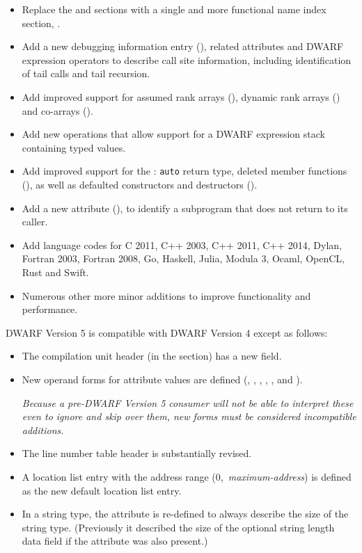\begin{itemize}
\item Replace the \dotdebugpubnames{} and \dotdebugpubtypes{} sections
with a single and more functional name index section, \dotdebugnames{}.
\item Add a new debugging information entry (\DWTAGcallsiteNAME), related 
attributes and DWARF expression operators to describe call site information, 
including identification of tail calls and tail recursion.
\item Add improved support for  assumed rank arrays 
(\DWTAGgenericsubrangeNAME), dynamic rank arrays (\DWATrankNAME)
and co-arrays (\DWTAGcoarraytypeNAME{}).
\item Add new operations that allow support for 
a DWARF expression stack containing typed values.
\item Add improved support for the :
\texttt{auto} return type, deleted member functions (\DWATdeletedNAME), 
as well as defaulted constructors and destructors (\DWATdefaultedNAME).
\item Add a new attribute (\DWATnoreturnNAME{}), to identify 
a subprogram that does not return to its caller.
\item Add language codes for C 2011, C++ 2003, C++ 2011, C++ 2014,
Dylan, Fortran 2003, Fortran 2008, Go, Haskell, 
Julia, Modula 3, Ocaml, OpenCL, Rust and Swift.
\item Numerous other more minor additions to improve functionality
and performance.
\end{itemize}

DWARF Version 5 is compatible with DWARF Version 4 except as follows:
\begin{itemize}
\item The compilation unit header (in the \dotdebuginfo{} section) has
a new \HFNunittype{} field.
\item New operand forms for attribute values are defined 
(\DWFORMaddrxNAME, \DWFORMdatasixteenNAME, \DWFORMimplicitconstNAME, 
\DWFORMlinestrpNAME, 
\DWFORMrefsupNAME, \DWFORMstrpsupNAME{} and \DWFORMstrxNAME).

\textit{Because a pre-DWARF Version 5 consumer will not be able to interpret 
these even to ignore and skip over them, new forms must be 
considered incompatible additions.}
\item The line number table header is substantially revised.
\item A location list entry 
with the address range \mbox{(0, \textit{maximum-address})} is defined 
as the new default location list entry.
\item In a string type, the \DWATbytesizeNAME{} attribute is re-defined 
to always describe the size of the string type. 
(Previously it described the size of the optional string length data 
field if the \DWATstringlengthNAME{} attribute was also present.)
\end{itemize}

